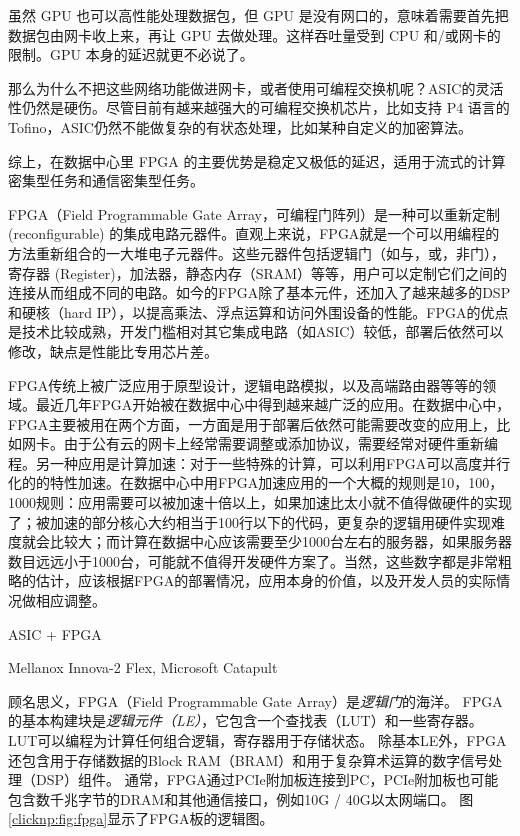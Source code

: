 虽然 GPU 也可以高性能处理数据包，但 GPU 是没有网口的，意味着需要首先把数据包由网卡收上来，再让 GPU 去做处理。这样吞吐量受到 CPU 和/或网卡的限制。GPU 本身的延迟就更不必说了。

那么为什么不把这些网络功能做进网卡，或者使用可编程交换机呢？ASIC的灵活性仍然是硬伤。尽管目前有越来越强大的可编程交换机芯片，比如支持 P4 语言的 Tofino，ASIC仍然不能做复杂的有状态处理，比如某种自定义的加密算法。

综上，在数据中心里 FPGA 的主要优势是稳定又极低的延迟，适用于流式的计算密集型任务和通信密集型任务。


FPGA（Field Programmable Gate Array，可编程门阵列）是一种可以重新定制 (reconfigurable) 的集成电路元器件。直观上来说，FPGA就是一个可以用编程的方法重新组合的一大堆电子元器件。这些元器件包括逻辑门（如与，或，非门），寄存器 (Register)，加法器，静态内存（SRAM）等等，用户可以定制它们之间的连接从而组成不同的电路。如今的FPGA除了基本元件，还加入了越来越多的DSP和硬核（hard IP），以提高乘法、浮点运算和访问外围设备的性能。FPGA的优点是技术比较成熟，开发门槛相对其它集成电路（如ASIC）较低，部署后依然可以修改，缺点是性能比专用芯片差。

FPGA传统上被广泛应用于原型设计，逻辑电路模拟，以及高端路由器等等的领域。最近几年FPGA开始被在数据中心中得到越来越广泛的应用。在数据中心中，FPGA主要被用在两个方面，一方面是用于部署后依然可能需要改变的应用上，比如网卡。由于公有云的网卡上经常需要调整或添加协议，需要经常对硬件重新编程。另一种应用是计算加速：对于一些特殊的计算，可以利用FPGA可以高度并行化的的特性加速。在数据中心中用FPGA加速应用的一个大概的规则是10，100，1000规则：应用需要可以被加速十倍以上，如果加速比太小就不值得做硬件的实现了；被加速的部分核心大约相当于100行以下的代码，更复杂的逻辑用硬件实现难度就会比较大；而计算在数据中心应该需要至少1000台左右的服务器，如果服务器数目远远小于1000台，可能就不值得开发硬件方案了。当然，这些数字都是非常粗略的估计，应该根据FPGA的部署情况，应用本身的价值，以及开发人员的实际情况做相应调整。

ASIC + FPGA

Mellanox Innova-2 Flex, Microsoft Catapult


顾名思义，FPGA（Field Programmable Gate Array）是\textit {逻辑门}的海洋。
FPGA的基本构建块是\textit {逻辑元件（LE）}，它包含一个查找表（LUT）和一些寄存器。
LUT可以编程为计算任何组合逻辑，寄存器用于存储状态。
除基本LE外，FPGA还包含用于存储数据的Block RAM（BRAM）和用于复杂算术运算的数字信号处理（DSP）组件。
通常，FPGA通过PCIe附加板连接到PC，PCIe附加板也可能包含数千兆字节的DRAM和其他通信接口，例如10G / 40G以太网端口。
图\ref{clicknp:fig:fpga}显示了FPGA板的逻辑图。

